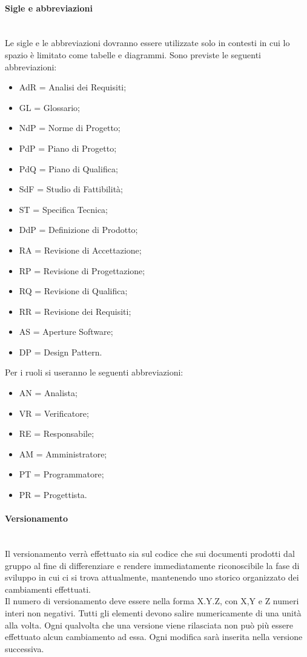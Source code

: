 \paragraph{Sigle e abbreviazioni} \hfill \\
\label{5.5}
Le sigle e le abbreviazioni dovranno essere utilizzate solo in contesti in cui lo spazio è limitato come tabelle e diagrammi. Sono previste le seguenti abbreviazioni:
\begin{itemize}
\item AdR = Analisi dei Requisiti;
\item GL = Glossario;
\item NdP = Norme di Progetto;
\item PdP = Piano di Progetto;
\item PdQ = Piano di Qualifica;
\item SdF = Studio di Fattibilità;
\item ST = Specifica Tecnica;
\item DdP = Definizione di Prodotto;
\item RA = Revisione di Accettazione;
\item RP = Revisione di Progettazione;
\item RQ = Revisione di Qualifica;
\item RR = Revisione dei Requisiti;
\item AS = Aperture Software;
\item DP = Design Pattern.
\end{itemize}
Per i ruoli si useranno le seguenti abbreviazioni:
\begin{itemize}
\item AN = Analista;
\item VR = Verificatore;
\item RE = Responsabile;
\item AM = Amministratore;
\item PT = Programmatore;
\item PR = Progettista.
\end{itemize}


\newpage
\paragraph{Versionamento} \hfill \\
\label{6.0}
Il versionamento verrà effettuato sia sul codice che sui documenti prodotti dal gruppo al fine di differenziare e rendere immediatamente riconoscibile la fase di sviluppo in cui ci si trova attualmente, mantenendo uno storico organizzato dei cambiamenti effettuati.\\
Il numero di versionamento deve essere nella forma X.Y.Z, con X,Y e Z numeri interi non negativi. Tutti gli elementi devono salire numericamente di una unità alla volta.
Ogni qualvolta che una versione viene rilasciata non può più essere effettuato alcun cambiamento ad essa. Ogni modifica sarà inserita nella versione successiva.



